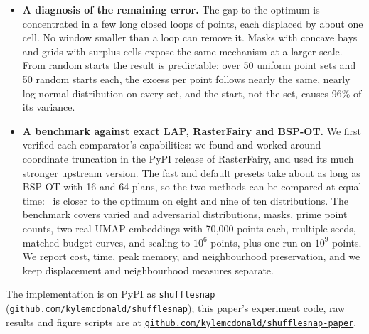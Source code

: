 \begin{itemize}
\item \textbf{A diagnosis of the remaining error.} The gap to the optimum is concentrated
  in a few long closed loops of points, each displaced by about one cell. No window
  smaller than a loop can remove it. Masks with concave bays and grids with surplus
  cells expose the same mechanism at a larger scale. From random starts the result is
  predictable: over 50 uniform point sets and 50 random starts each, the excess per point
  follows nearly the same, nearly log-normal distribution on every set, and the start, not the
  set, causes 96\% of its variance.
\item \textbf{A benchmark against exact LAP, RasterFairy and BSP-OT.} We first verified
  each comparator's capabilities: we found and worked around coordinate truncation in the
  PyPI release of RasterFairy, and used its much stronger upstream version. The
  fast and default presets take about as long as BSP-OT with 16 and 64 plans, so the two
  methods can be compared at equal time: \ShuffleSnap\ is closer to the optimum on eight and
  nine of ten distributions. The benchmark covers varied and adversarial distributions,
  masks, prime point counts, two
  real UMAP embeddings with 70{,}000 points each, multiple seeds, matched-budget curves,
  and scaling to $10^6$ points, plus one run on $10^9$ points. We report cost, time, peak memory, and neighbourhood
  preservation, and we keep displacement and neighbourhood measures separate.
\end{itemize}

The implementation is on PyPI as \texttt{shufflesnap} (\href{https://github.com/kylemcdonald/shufflesnap}{\nolinkurl{github.com/kylemcdonald/shufflesnap}}); this paper's experiment
code, raw results and figure scripts are at \href{https://github.com/kylemcdonald/shufflesnap-paper}{\nolinkurl{github.com/kylemcdonald/shufflesnap-paper}}.
